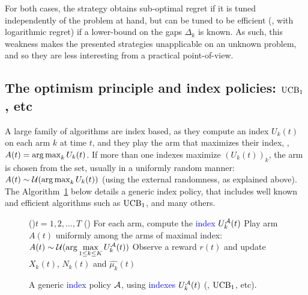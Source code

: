 For both cases, the strategy obtains sub-optimal regret if it is tuned independently of the problem at hand, but can be tuned to be efficient (\ie, with logarithmic regret) if a lower-bound on the gaps $\Delta_k$ is known.
As such, this weakness makes the presented strategies unapplicable on an unknown problem, and so they are less interesting from a practical point-of-view.


\subsection{The optimism principle and index policies: $\UCB_1$, \klUCB{} etc}
\label{sub:2:IndexPolicies}

A large family of algorithms are index based, as they compute an index $U_k(t)$ on each arm $k$ at time $t$,
and they play the arm that maximizes their index, \ie, $A(t) = \operatorname*{arg\,max}_k U_k(t)$.
If more than one indexes maximize $(U_k(t))_k$, the arm is chosen from the set, usually in a uniformly random manner: $A(t) \sim \mathcal{U}(\operatorname*{arg\,max}_k U_k(t))$ (using the external randomness, as explained above).
%
The Algorithm~\ref{algo:2:indexPolicy} below details a generic index policy, that includes well known and efficient algorithms such as $\UCB_1$, \klUCB{} and many others.

\begin{figure}[h!]
	\centering
    \begin{framed}
	\begin{algorithm}[H]
		\For(){$t = 1, 2, \dots, T$}{
			\uElse(){
                For each arm, compute the \textcolor{blue}{index $U_k^{\mathcal{A}}(t)$}\;
                Play arm $A(t)$ uniformly among the arms of maximal index: \textcolor{blue}{$A(t) \sim \mathcal{U}(\arg\max\limits_{1\leq k \leq K} U_k^{\mathcal{A}}(t))$}\;
            }
            Observe a reward $r(t)$ and update $X_k(t)$, $N_k(t)$ and $\widehat{\mu_k}(t)$\;
		}
		\caption[{A generic index policy $\cA$, using indexes $U_k(t)$ (\eg, $\UCB_1$, \klUCB{} etc).}]{A generic \textcolor{blue}{index} policy $\cA$, using \textcolor{blue}{indexes $U_k^{\mathcal{A}}(t)$} (\eg, $\UCB_1$, \klUCB{} etc).}
		\label{algo:2:indexPolicy}
	\end{algorithm}
	\end{framed}
\end{figure}


